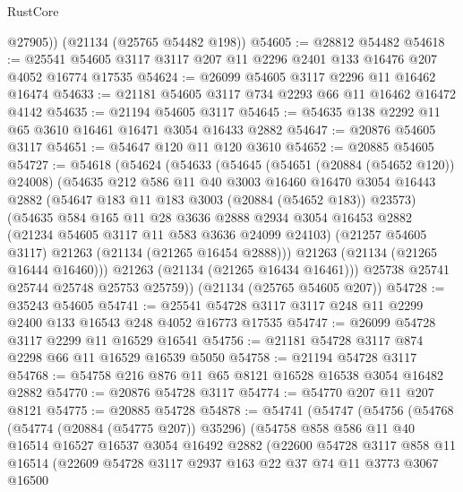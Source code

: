 \begin{lexlean}{RustCore}
\begin{coremodule}
        @27905))
    (@21134 (@25765 @54482 @198))
@54605 := @28812 @54482
@54618 := @25541 @54605 @3117 @3117 @207 @11 @2296 @2401 @133 @16476 @207 @4052 @16774 @17535
@54624 := @26099 @54605 @3117 @2296 @11 @16462 @16474
@54633 := @21181 @54605 @3117 @734 @2293 @66 @11 @16462 @16472 @4142
@54635 := @21194 @54605 @3117
@54645 := @54635 @138 @2292 @11 @65 @3610 @16461 @16471 @3054 @16433 @2882
@54647 := @20876 @54605 @3117
@54651 := @54647 @120 @11 @120 @3610
@54652 := @20885 @54605
@54727 := @54618
    (@54624
      (@54633
        (@54645
          (@54651 (@20884 (@54652 @120)) @24008)
          (@54635
            @212
            @586
            @11
            @40
            @3003
            @16460
            @16470
            @3054
            @16443
            @2882
            (@54647 @183 @11 @183 @3003 (@20884 (@54652 @183)) @23573)
            (@54635
              @584
              @165
              @11
              @28
              @3636
              @2888
              @2934
              @3054
              @16453
              @2882
              (@21234 @54605 @3117 @11 @583 @3636 @24099 @24103)
              (@21257 @54605 @3117)
              @21263
              (@21134 (@21265 @16454 @2888)))
            @21263
            (@21134 (@21265 @16444 @16460)))
          @21263
          (@21134 (@21265 @16434 @16461)))
        @25738
        @25741
        @25744
        @25748
        @25753
        @25759))
    (@21134 (@25765 @54605 @207))
@54728 := @35243 @54605
@54741 := @25541 @54728 @3117 @3117 @248 @11 @2299 @2400 @133 @16543 @248 @4052 @16773 @17535
@54747 := @26099 @54728 @3117 @2299 @11 @16529 @16541
@54756 := @21181 @54728 @3117 @874 @2298 @66 @11 @16529 @16539 @5050
@54758 := @21194 @54728 @3117
@54768 := @54758 @216 @876 @11 @65 @8121 @16528 @16538 @3054 @16482 @2882
@54770 := @20876 @54728 @3117
@54774 := @54770 @207 @11 @207 @8121
@54775 := @20885 @54728
@54878 := @54741
    (@54747
      (@54756
        (@54768
          (@54774 (@20884 (@54775 @207)) @35296)
          (@54758
            @858
            @586
            @11
            @40
            @16514
            @16527
            @16537
            @3054
            @16492
            @2882
            (@22600
              @54728
              @3117
              @858
              @11
              @16514
              (@22609
                @54728
                @3117
                @2937
                @163
                @22
                @37
                @74
                @11
                @3773
                @3067
                @16500

\end{coremodule}
\end{lexlean}
